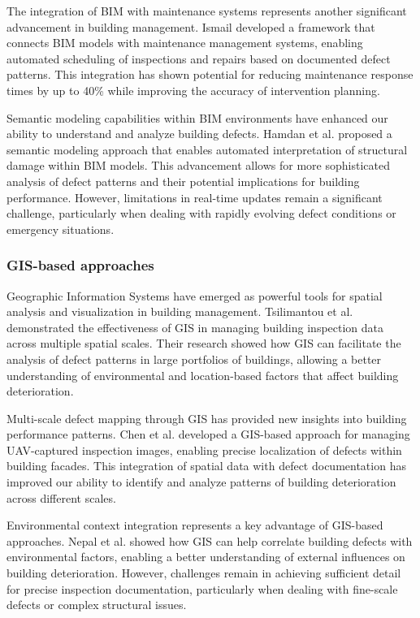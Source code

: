 \documentclass[a4paper,fleqn]{cas-sc}
\begin{document}
The integration of BIM with maintenance systems represents another significant advancement in building management. Ismail \cite{ismail2021how} developed a framework that connects BIM models with maintenance management systems, enabling automated scheduling of inspections and repairs based on documented defect patterns. This integration has shown potential for reducing maintenance response times by up to 40\% while improving the accuracy of intervention planning.

Semantic modeling capabilities within BIM environments have enhanced our ability to understand and analyze building defects. Hamdan et al. \cite{hamdan2021semantic} proposed a semantic modeling approach that enables automated interpretation of structural damage within BIM models. This advancement allows for more sophisticated analysis of defect patterns and their potential implications for building performance. However, limitations in real-time updates remain a significant challenge, particularly when dealing with rapidly evolving defect conditions or emergency situations.

\subsubsection{GIS-based approaches}

Geographic Information Systems have emerged as powerful tools for spatial analysis and visualization in building management. Tsilimantou et al. \cite{tsilimantou2020gis} demonstrated the effectiveness of GIS in managing building inspection data across multiple spatial scales. Their research showed how GIS can facilitate the analysis of defect patterns in large portfolios of buildings, allowing a better understanding of environmental and location-based factors that affect building deterioration.

Multi-scale defect mapping through GIS has provided new insights into building performance patterns. Chen et al. \cite{chen2021geo} developed a GIS-based approach for managing UAV-captured inspection images, enabling precise localization of defects within building facades. This integration of spatial data with defect documentation has improved our ability to identify and analyze patterns of building deterioration across different scales.

Environmental context integration represents a key advantage of GIS-based approaches. Nepal et al. \cite{nepal2021towards} showed how GIS can help correlate building defects with environmental factors, enabling a better understanding of external influences on building deterioration. However, challenges remain in achieving sufficient detail for precise inspection documentation, particularly when dealing with fine-scale defects or complex structural issues.
\end{document}
